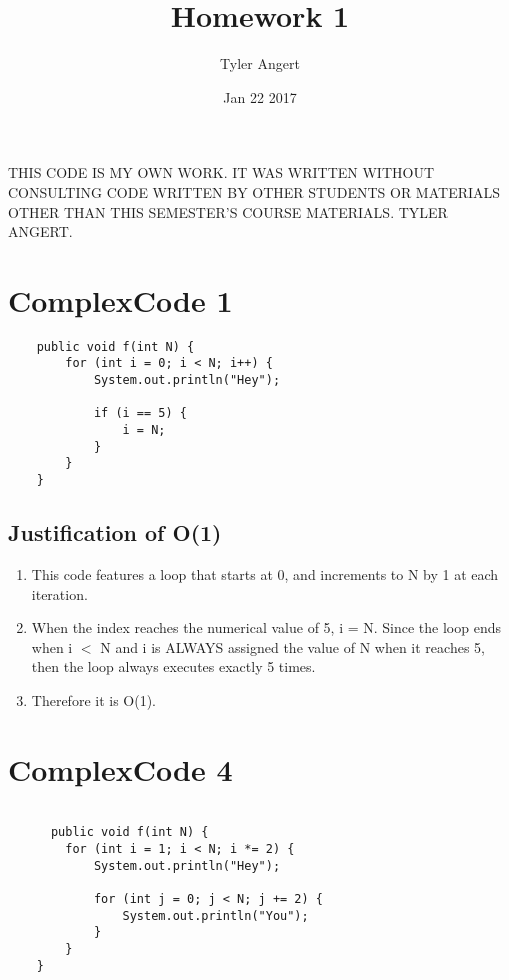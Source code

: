 \documentclass[11pt]{article}
\title{Homework 1}
\author{Tyler Angert}
\date{Jan 22 2017}
\begin{document}
\maketitle

\begin{center}
THIS CODE IS MY OWN WORK. IT WAS WRITTEN WITHOUT CONSULTING CODE WRITTEN BY OTHER
STUDENTS OR MATERIALS OTHER THAN THIS SEMESTER'S COURSE MATERIALS. TYLER ANGERT.
\end{center}

\section{ComplexCode 1}
\begin{lstlisting}
    public void f(int N) {
		for (int i = 0; i < N; i++) {
			System.out.println("Hey");

			if (i == 5) {
				i = N;
			}	
		}
	}
\end{lstlisting}
\subsection{Justification of O(1)}
\begin{enumerate}
  \item This code features a loop that starts at 0, and increments to N by 1 at 
  each iteration.
  \item When the index reaches the numerical value of 5, i = N. Since the loop ends when i  $<$ N
  and i is ALWAYS assigned the value of N when it reaches 5, then the loop always executes exactly 5
  times.
  \item Therefore it is O(1).
\end{enumerate}

\section{ComplexCode 4}
\begin{lstlisting}
  
      public void f(int N) {
		for (int i = 1; i < N; i *= 2) {
			System.out.println("Hey");
			
			for (int j = 0; j < N; j += 2) {
				System.out.println("You");
			}
		}
	}
\end{lstlisting}
\end{document}
